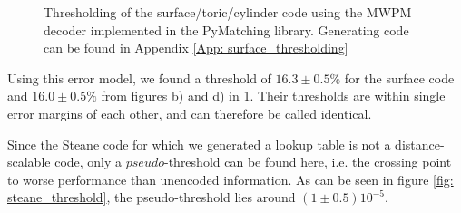 \begin{figure}[h!]
    \hfill
    \caption{Thresholding of the surface/toric/cylinder code using the MWPM decoder implemented in the PyMatching \cite{MWPMDecoder} library.
    Generating code can be found in Appendix \ref{App: surface_thresholding}}
    \label{fig:surface_threshold}
\end{figure}

Using this error model, we found a threshold of $16.3\pm 0.5 \%$ for the surface code
and $16.0\pm 0.5\%$ from
figures b) and d) in \ref{fig:surface_threshold}. 
Their thresholds are within single error margins of each other, and 
can therefore be called identical.

Since the Steane code for which we generated a lookup table is not 
a distance-scalable code, only a $pseudo$-threshold can
be found here, i.e. the crossing point to worse performance than unencoded
information. As can be seen in figure \ref{fig: steane_threshold}, the
pseudo-threshold lies around $(1 \pm 0.5)10^{-5}$.


